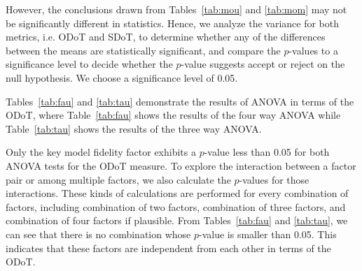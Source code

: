 However, the conclusions drawn from Tables~\ref{tab:mou} and \ref{tab:mom} may not be significantly different in statistics.
Hence, we analyze the variance for both metrics, i.e. ODoT and SDoT, to determine whether any of the differences between the means are statistically significant, and compare the $p$-values to a significance level to decide whether the $p$-value suggests accept or reject on the null hypothesis. We choose a significance level of 0.05.

Tables~\ref{tab:fau} and \ref{tab:tau} demonstrate the results of ANOVA in terms of the ODoT, where Table~\ref{tab:fau} shows the results of the four way ANOVA while Table~\ref{tab:tau} shows the results of the three way ANOVA.

Only the key model fidelity factor exhibits a $p$-value less than 0.05 for both ANOVA tests for the ODoT measure.
To explore the interaction between a factor pair or among multiple factors, we also calculate the $p$-values for those interactions.
These kinds of calculations are performed for every combination of factors, including combination of two factors, combination of three factors, and combination of four factors if plausible.
From Tables~\ref{tab:fau} and \ref{tab:tau}, we can see that there is no combination whose $p$-value is smaller than 0.05.
This indicates that these factors are independent from each other in terms of the ODoT.

